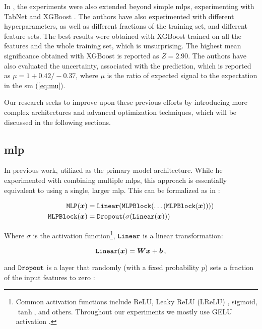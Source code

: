 In \jan, the experiments were also extended beyond simple \glspl{mlp}, experimenting with TabNet \cite{tabnet} and
XGBoost \cite{xgboost}. The authors have also experimented with different hyperparameters, as well as different
fractions of the training set, and different feature sets. The best results were obtained with XGBoost trained on all
the features and the whole training set, which is unsurprising. The highest mean significance obtained with XGBoost is
reported as $Z = 2.90$. The authors have also evaluated the uncertainty, associated with the prediction, which is
reported as $\mu = 1 + 0.42 /- 0.37$, where $\mu$ is the ratio of expected signal to the expectation in the \gls{sm}
(\autoref{eq:mu}).






Our research seeks to improve upon these previous efforts by introducing more complex architectures and advanced
optimization techniques, which will be discussed in the following sections.

\subsection[Multilayer Perceptron]{\acrfull{mlp}}

In previous work, \severin utilized  as the primary model architecture.
While he experimented with combining multiple \glspl{mlp}, this approach is essentially equivalent to using a single,
larger \gls{mlp}. This can be formalized as in \cite{ft-transformer}:

\begin{align}
    \texttt{MLP}({\boldsymbol{x}})      & = \texttt{Linear}(\texttt{MLPBlock}(\dots(\texttt{MLPBlock}({\boldsymbol{x}})))) \\
    \texttt{MLPBlock}({\boldsymbol{x}}) & = \texttt{Dropout}(\sigma(\texttt{Linear}({\boldsymbol{x}})))
\end{align}

Where $\sigma$ is the activation function\footnote{Common activation functions include ReLU, Leaky ReLU (LReLU)
    \cite{relu, lrelu}, sigmoid, $\tanh$, and others. Throughout our experiments we mostly use GELU activation
    \cite{gelu}.},
$\texttt{Linear}$ is a linear transformation:

\begin{equation}
    \texttt{Linear}({\boldsymbol{x}}) = {\boldsymbol{W}}{\boldsymbol{x}} + {\boldsymbol{b}}\,,
\end{equation}

and $\texttt{Dropout}$ is a layer that randomly (with a fixed probability $p$) sets a fraction of the input features to
zero \cite{dropout}:

